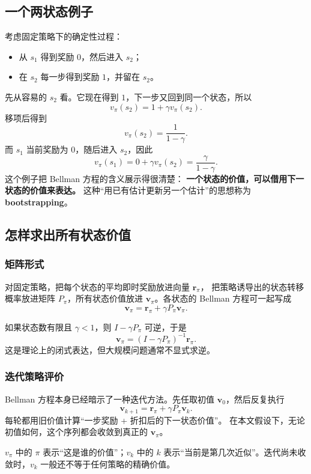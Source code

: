 \documentclass[11pt,a4paper,fontset=fandol]{ctexart}
\newcommand{\vpi}{v_{\pi}}
\begin{document}
\subsection{一个两状态例子}

考虑固定策略下的确定性过程：

\begin{itemize}
  \item 从 \(s_1\) 得到奖励 \(0\)，然后进入 \(s_2\)；
  \item 在 \(s_2\) 每一步得到奖励 \(1\)，并留在 \(s_2\)。
\end{itemize}

先从容易的 \(s_2\) 看。它现在得到 \(1\)，下一步又回到同一个状态，所以
\[
\vpi(s_2)=1+\gamma\vpi(s_2).
\]
移项后得到
\[
\vpi(s_2)=\frac{1}{1-\gamma}.
\]
而 \(s_1\) 当前奖励为 \(0\)，随后进入 \(s_2\)，因此
\[
\vpi(s_1)=0+\gamma\vpi(s_2)
=\frac{\gamma}{1-\gamma}.
\]
这个例子把 Bellman 方程的含义展示得很清楚：
\textbf{一个状态的价值，可以借用下一状态的价值来表达。}
这种“用已有估计更新另一个估计”的思想称为 \textbf{bootstrapping}。

\subsection{怎样求出所有状态价值}

\subsubsection{矩阵形式}

对固定策略，把每个状态的平均即时奖励放进向量 \(\bm r_\pi\)，
把策略诱导出的状态转移概率放进矩阵 \(P_\pi\)，所有状态价值放进
\(\bm v_\pi\)。各状态的 Bellman 方程可一起写成
\[
\boxed{
\bm v_\pi=\bm r_\pi+\gamma P_\pi\bm v_\pi
}.
\]

如果状态数有限且 \(\gamma<1\)，则 \(I-\gamma P_\pi\) 可逆，于是
\[
\bm v_\pi=(I-\gamma P_\pi)^{-1}\bm r_\pi.
\]
这是理论上的闭式表达，但大规模问题通常不显式求逆。

\subsubsection{迭代策略评价}

Bellman 方程本身已经暗示了一种迭代方法。先任取初值
\(\bm v_0\)，然后反复执行
\[
\boxed{
\bm v_{k+1}=\bm r_\pi+\gamma P_\pi\bm v_k
}.
\]
每轮都用旧价值计算“一步奖励 + 折扣后的下一状态价值”。
在本文假设下，无论初值如何，这个序列都会收敛到真正的
\(\bm v_\pi\)。

\begin{warningbox}[下标最容易混淆的地方]
\(v_\pi\) 中的 \(\pi\) 表示“这是谁的价值”；\(v_k\) 中的 \(k\)
表示“当前是第几次近似”。迭代尚未收敛时，\(v_k\) 一般还不等于任何策略的精确价值。
\end{warningbox}
\end{document}
